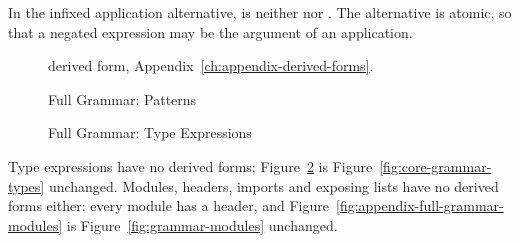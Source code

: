 In the infixed application alternative, \opv{} is neither \kw{\&\&} nor
\kw{||}. The alternative \kw{-}\atexp{} is atomic, so that a negated
expression may be the argument of an application.

\begin{figure}[tbp]
\centering
\begin{grammar}
\noalign{\smallskip}
\noalign{\smallskip}
\end{grammar}
\medskip
{\small\fgderived{} derived form, Appendix~\ref{ch:appendix-derived-forms}.\par}
\caption{Full Grammar: Patterns}
\label{fig:appendix-full-grammar-patterns}
\end{figure}

\begin{figure}[tbp]
\centering
\begin{grammar}
\noalign{\smallskip}
\end{grammar}
\caption{Full Grammar: Type Expressions}
\label{fig:appendix-full-grammar-types}
\end{figure}

Type expressions have no derived forms; Figure~\ref{fig:appendix-full-grammar-types}
is Figure~\ref{fig:core-grammar-types} unchanged. Modules, headers, imports and
exposing lists have no derived forms either: every module has a header, and
Figure~\ref{fig:appendix-full-grammar-modules} is
Figure~\ref{fig:grammar-modules} unchanged.

